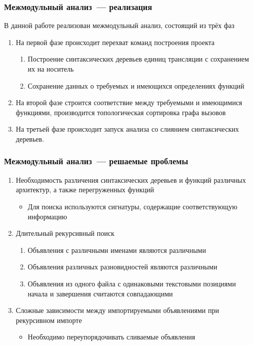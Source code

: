 \documentclass[hyperref={pdfpagelabels=false}]{beamer}
\begin{document}
\begin{frame}
\frametitle{Межмодульный анализ~--- реализация}
В данной работе реализован межмодульный анализ, состоящий из трёх фаз
\begin{enumerate}
  \item На первой фазе происходит перехват команд построения проекта
  \begin{enumerate}
    \item Построение синтаксических деревьев единиц трансляции с сохранением их на носитель
    \item Сохранение данных о требуемых и имеющихся определениях функций
  \end{enumerate}
  \item На второй фазе строится соответствие между требуемыми и имеющимися функциями, производится топологическая сортировка графа вызовов
  \item На третьей фазе происходит запуск анализа со слиянием синтаксических деревьев.
\end{enumerate}
\end{frame}

\begin{frame}[allowframebreaks]
\frametitle{Межмодульный анализ~--- решаемые проблемы}
\begin{enumerate}
  \item Необходимость различения синтаксических деревьев и функций различных архитектур, а также перегруженных функций
    \begin{itemize}
      \item Для поиска используются сигнатуры, содержащие соответствующую информацию
    \end{itemize}
  \item Длительный рекурсивный поиск
  \begin{enumerate}
    \item Объявления с различными именами являются различными
    \item Объявления различных разновидностей являются различными
    \item Объявления из одного файла с одинаковыми текстовыми позициями начала и завершения считаются совпадающими
  \end{enumerate}
  \item Сложные зависимости между импортируемыми объявлениями при рекурсивном импорте
    \begin{itemize}
      \item Необходимо переупорядочивать сливаемые объявления
    \end{itemize}
\end{enumerate}
\end{frame}
\end{document}
